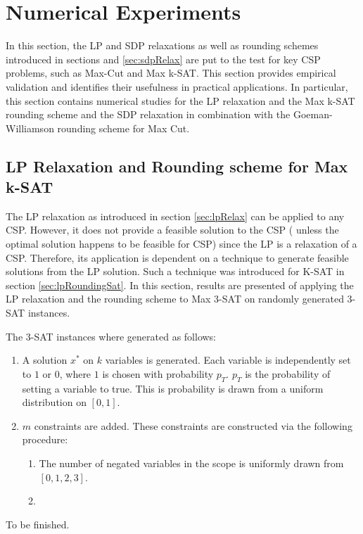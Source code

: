\section{Numerical Experiments}
In this section, the LP and SDP relaxations as well as rounding schemes introduced in sections \label{sec:lpRelax} and \ref{sec:sdpRelax} are put to the test for key CSP problems, such as Max-Cut and Max k-SAT. This section provides empirical validation and identifies their usefulness in practical applications. In particular, this section contains numerical studies for the LP relaxation and the Max k-SAT rounding scheme and the SDP relaxation in combination with the Goeman-Williamson rounding scheme for Max Cut. 

\subsection{LP Relaxation and Rounding scheme for Max k-SAT}
The LP relaxation as introduced in section \ref{sec:lpRelax} can be applied to any CSP. However, it does not provide a feasible solution to the CSP ( unless the optimal solution happens to be feasible for CSP) since the LP is a relaxation of a CSP. Therefore, its application is dependent on a technique to generate feasible solutions from the LP solution. Such a technique was introduced for K-SAT in section \ref{sec:lpRoundingSat}. In this section, results are presented of applying the LP relaxation and the rounding scheme to Max 3-SAT on randomly generated 3-SAT instances.

The 3-SAT instances where generated as follows:
\begin{enumerate}
	\item A solution $x^*$ on $k$ variables is generated. Each variable is independently set to $1$ or $0$, where $1$ is chosen with probability $p_T$. $p_T$ is the probability of setting a variable to true. This is probability is drawn from a uniform distribution on $[0,1]$. 
	\item $m$ constraints are added. These constraints are constructed via the following procedure:
	\begin{enumerate}
		\item The number of negated variables in the scope is uniformly drawn from $[0,1,2,3]$.
		\item 
	\end{enumerate}
\end{enumerate}

To be finished.

